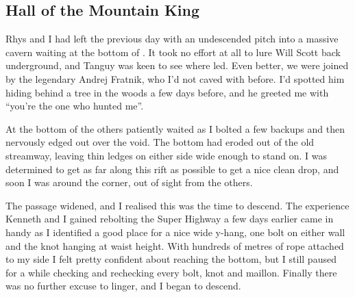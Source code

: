 \subsection{Hall of the Mountain King}
\begin{marginfigure}
\end{marginfigure}
Rhys and I had left the previous day with an undescended pitch into a massive cavern waiting at the bottom of . It took no effort at all to lure Will Scott back underground, and Tanguy was keen to see where  led. Even better, we were joined by the legendary Andrej Fratnik, who I’d not caved with before. I’d spotted him hiding behind a tree in the woods a few days before, and he greeted me with “you’re the one who hunted me”.
 
At the bottom of  the others patiently waited as I bolted a few backups and then nervously edged out over the void. The bottom had eroded out of the old streamway, leaving thin ledges on either side wide enough to stand on. I was determined to get as far along this rift as possible to get a nice clean drop, and soon I was around the corner, out of sight from the others.  
 
The passage widened, and I realised this was the time to descend. The experience Kenneth and I gained rebolting the Super Highway a few days earlier came in handy as I identified a good place for a nice wide y-hang, one bolt on either wall and the knot hanging at waist height. With hundreds of metres of rope attached to my side I felt pretty confident about reaching the bottom, but I still paused for a while checking and rechecking every bolt, knot and maillon. Finally there was no further excuse to linger, and I began to descend.
 
